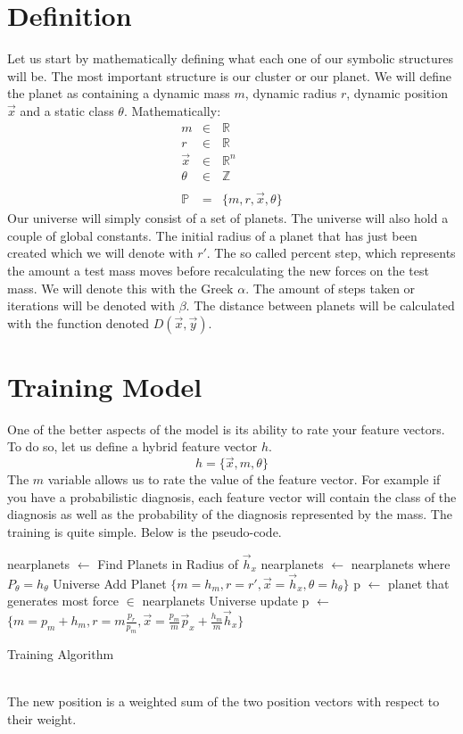 \documentclass[journal]{IEEEtran}
\begin{document}
\section{Definition}
Let us start by mathematically defining what each one of our symbolic structures will be. The most important structure is our cluster or our planet. We will define the planet as containing a dynamic mass $m$, dynamic radius $r$, dynamic position $\overrightarrow{x}$ and a static class $\theta$. Mathematically:
\begin{equation}
	\begin{array}
		{lcl} 
		m & \in & \mathbb{R} \\ 
		r & \in & \mathbb{R} \\ 
		\overrightarrow{x} & \in & \mathbb{R}^n \\ 
		\theta & \in & \mathbb{Z} \\ \\
		 \mathbb{P} & = & \{m,r,\overrightarrow{x},\theta\}
	\end{array}
\end{equation}
Our universe will simply consist of a set of planets. The universe will also hold a couple of global constants. The initial radius of a planet that has just been created which we will denote with $r'$. The so called percent step, which represents the amount a test mass moves before recalculating the new forces on the test mass. We will denote this with the Greek $\alpha$. The amount of steps taken or iterations will be denoted with $\beta$. The distance between planets will be calculated with the function denoted $D(\overrightarrow{x},\overrightarrow{y})$.  
\section{Training Model}
One of the better aspects of the model is its ability to rate your feature vectors. To do so, let us define a hybrid feature vector $h$.
\begin{equation}
h=\{\overrightarrow{x}, m,\theta\}
\end{equation} 
The $m$ variable allows us to rate the value of the feature vector. For example if you have a probabilistic diagnosis, each feature vector will contain the class of the diagnosis as well as the probability of the diagnosis represented by the mass. The training is quite simple. 
Below is the pseudo-code.
\begin{algorithm}
 nearplanets $\leftarrow$ Find Planets in Radius of $\overrightarrow{h}_x$\;
 nearplanets $\leftarrow$ nearplanets where $P_\theta = h_\theta$ \;
 {
	Universe Add Planet $\{m = h_m,r = r',\overrightarrow{x} = \overrightarrow{h}_x, \theta = h_\theta\}$ 
 }
 {
 p $\leftarrow$ planet that generates most force $\in$ nearplanets \;
 Universe update p $\leftarrow$  $\{m = p_m + h_m,r = m\frac{p_r}{p_m}, \overrightarrow{x} = \frac{p_m}{m}\overrightarrow{p}_x+ \frac{h_m}{m}\overrightarrow{h}_x \}$ 
 }
\caption{Training Algorithm}
\end{algorithm}
\\
The new position is a weighted sum of the two position vectors with respect to their weight.
\end{document}
